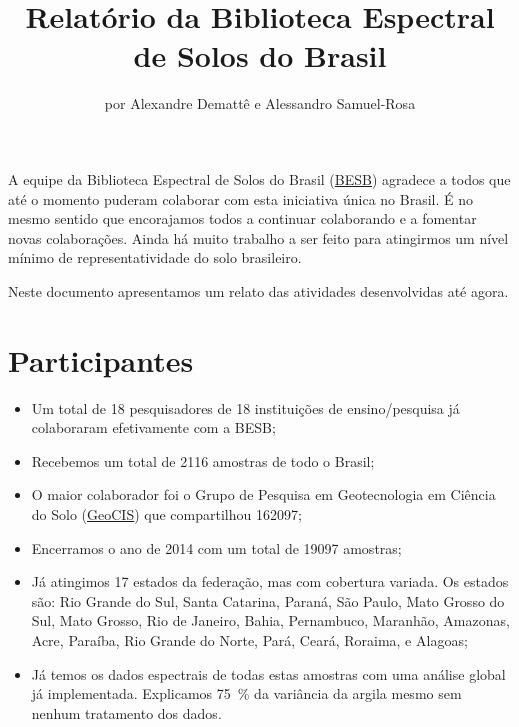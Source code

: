 \title{Relatório da Biblioteca Espectral de Solos do Brasil}
\author{por Alexandre Demattê e Alessandro Samuel-Rosa}
\maketitle

\newcommand{\BESB}{\href{http://bibliotecaespectral.wix.com/esalq}{BESB}}
\newcommand{\GeoCIS}{\href{http://esalqgeocis.wix.com/geocis}{GeoCIS}}
\newcommand{\GESB}{\href{https://uspdigital.usp.br/tycho/gruposPesquisaObter?codigoGrupoPesquisa=00675018IPZBKR}{GESB}}

A equipe da Biblioteca Espectral de Solos do Brasil (\BESB) agradece a todos que até o momento puderam colaborar com esta iniciativa única no Brasil. É no mesmo sentido que encorajamos todos a continuar colaborando e a fomentar novas colaborações. Ainda há muito trabalho a ser feito para atingirmos um nível mínimo de representatividade do solo brasileiro.

Neste documento apresentamos um relato das atividades desenvolvidas até agora.

\section{Participantes}

\begin{itemize}
  \item Um total de 18 pesquisadores de 18 instituições de ensino/pesquisa já colaboraram efetivamente com a BESB;
  \item Recebemos um total de \num{2116} amostras de todo o Brasil;
  \item O maior colaborador foi o Grupo de Pesquisa em Geotecnologia em Ciência do Solo (\GeoCIS) que compartilhou \num{162097};
  \item Encerramos o ano de 2014 com um total de \num{19097} amostras;
  \item Já atingimos 17 estados da federação, mas com cobertura variada. Os estados são: Rio Grande do Sul, Santa Catarina, Paraná, São Paulo, Mato Grosso do Sul, Mato Grosso, Rio de Janeiro, Bahia, Pernambuco, Maranhão, Amazonas, Acre, Paraíba, Rio Grande do Norte, Pará, Ceará, Roraima, e Alagoas;
  \item Já temos os dados espectrais de todas estas amostras com uma análise global já implementada. Explicamos \SI{75}{\percent} da variância da argila mesmo sem nenhum tratamento dos dados.
\end{itemize}

